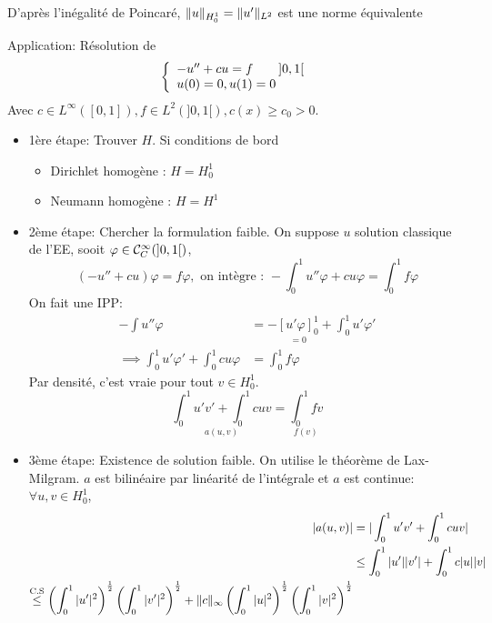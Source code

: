 \documentclass[]{report}
\begin{document}
    \begin{re}{}{}
        D'après l'inégalité de Poincaré, $\lVert u \rVert_{H_0^1}=\lVert u' \rVert_{L^2}$ est une norme équivalente
    \end{re}

    Application: Résolution de 
    \[\left\{\begin{array}{ll} -u''+cu=f\qquad ]0,1[\\ u(0)=0,u(1)=0 \end{array} \right.\]
    Avec $c\in L^\infty([0,1]),f\in L^2(]0,1[),c(x)\ge c_0> 0$.

    \begin{itemize}
        \item 1ère étape: Trouver $H$.
        Si conditions de bord \begin{itemize}
            \item Dirichlet homogène : $H=H_0^1$
            \item Neumann homogène : $H=H^1$
        \end{itemize}
        \item 2ème étape: Chercher la formulation faible. On suppose $u$ solution classique de l'EE, sooit $\varphi \in \mathcal{C}_C^\infty(]0,1[)$,
        \[(-u''+cu)\varphi= f\varphi,\text{ on intègre : }-\int_0^1 u''\varphi +cu\varphi= \int_{0}^{1}f \varphi\]
        On fait une IPP:
        \begin{align*}
            -\int u'' \varphi&=-\underset{=0}{[u'\varphi]_0^1}+\int_{0}^{1}u'\varphi'\\
            \implies \int_{0}^{1} u'\varphi'+\int_{0}^{1} cu\varphi&=\int_{0}^{1}f\varphi
        \end{align*}
        Par densité, c'est vraie pour tout $v\in H^1_0$.\\
        \[\underset{a(u,v)}{\int_{0}^{1}u'v'+\int_{0}^{1} cuv}=\underset{f(v)}{\int_{0}^{1} fv}\]
        \item 3ème étape: Existence de solution faible. On utilise le théorème de Lax-Milgram. $a$ est bilinéaire par linéarité de l'intégrale et $a$ est continue: $\forall u,v\in H_0^1$,
        \begin{align*}
            |a(u,v)|&=|\int_{0}^{1} u'v'+\int_{0}^{1}cuv|\\
            &\le \int_{0}^{1}|u'||v'|+\int_{0}^{1} c|u||v|\\
            \overset{\text{C.S}}{\le } \left(\int_{0}^{1}|u'|^2\right)^{\frac{1}{2}}\left(\int_{0}^{1} |v'|^2\right)^{\frac{1}{2}}+\lVert c \rVert_{\infty}\left(\int_{0}^{1}|u|^2\right)^{\frac{1}{2}}\left(\int_{0}^{1} |v|^2\right)^{\frac{1}{2}}
        \end{align*}

\end{itemize}
\end{document}
